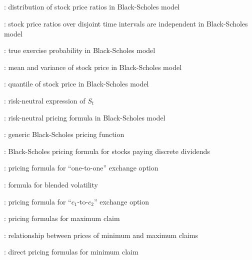 \subsection*{}
\item {}: distribution of stock price ratios in Black-Scholes model
\item {}: stock price ratios over disjoint time intervals are independent in Black-Scholes model
\item {}: true exercise probability in Black-Scholes model
\item {}: mean and variance of stock price in Black-Scholes model
\item {}: quantile of stock price in Black-Scholes model
\item {}: risk-neutral expression of \(S_t\)
\item {}: risk-neutral pricing formula in Black-Scholes model
\item {}: generic Black-Scholes pricing function
\item {}: Black-Scholes pricing formula for stocks paying discrete dividends
\item {}: pricing formula for ``one-to-one'' exchange option
\item {}: formula for blended volatility
\item {}: pricing formula for
``\(c_1\)-to-\(c_2\)'' exchange option
\item {}: pricing formulas for maximum claim
\item {}: relationship between prices of minimum and maximum claims
\item {}: direct pricing formulas for minimum claim

